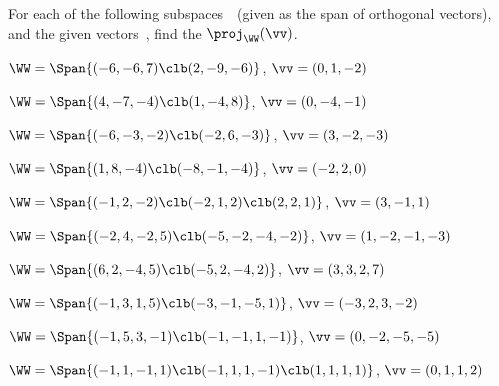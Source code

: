 \begin{exercise} \label{ex:} 
For each of the following subspaces~\WW\ (given as the span of orthogonal vectors), and the given vectors~\vv, find the  \(\proj_\WW(\vv)\). 

\begin{parts}
\item \(\WW=\Span\{(-6,-6,7)\clb(2,-9,-6)\}\), \(\vv=(0,1,-2)\)

\item \(\WW=\Span\{(4,-7,-4)\clb(1,-4,8)\}\), \(\vv=(0,-4,-1)\)

\item \(\WW=\Span\{(-6,-3,-2)\clb(-2,6,-3)\}\), \(\vv=(3,-2,-3)\)

\item \(\WW=\Span\{(1,8,-4)\clb(-8,-1,-4)\}\), \(\vv=(-2,2,0)\)

\item \(\WW=\Span\{(-1,2,-2)\clb(-2,1,2)\clb(2,2,1)\}\), \(\vv=(3,-1,1)\)
\answer{\(\proj_\WW(\vv)=\vv\)}

\item \(\WW=\Span\{(-2,4,-2,5)\clb(-5,-2,-4,-2)\}\), \(\vv=(1,-2,-1,-3)\)

\item \(\WW=\Span\{(6,2,-4,5)\clb(-5,2,-4,2)\}\), \(\vv=(3,3,2,7)\)

\item \(\WW=\Span\{(-1,3,1,5)\clb(-3,-1,-5,1)\}\), \(\vv=(-3,2,3,-2)\)

\item \(\WW=\Span\{(-1,5,3,-1)\clb(-1,-1,1,-1)\}\), \(\vv=(0,-2,-5,-5)\)

\item \(\WW=\Span\{(-1,1,-1,1)\clb(-1,1,1,-1)\clb( 1,1,1,1)\}\), \(\vv=(0,1,1,2)\)


\end{parts}
\end{exercise}
